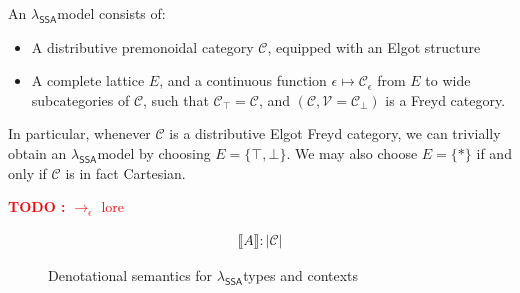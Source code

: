 \documentclass[acmsmall,screen,review]{acmart}
\newcounter{todos}
\newcommand{\TODO}[1]{{
  \stepcounter{todos}
  \begin{center}\large{\textcolor{red}{\textbf{TODO \arabic{todos}:} #1}}\end{center}
}}
\newcommand{\mc}[1]{\ensuremath{\mathcal{#1}}}
\newcommand{\ms}[1]{\ensuremath{\mathsf{#1}}}
\newcommand{\dnt}[1]{\llbracket{#1}\rrbracket}
\newcommand{\isotopessa}{\(\lambda_{\ms{SSA}}\)}
\begin{document}
An \isotopessa model consists of:
\begin{itemize}
  \item A distributive premonoidal category $\mc{C}$, equipped with an Elgot structure
  \item A complete lattice $E$, and a continuous function $\epsilon \mapsto \mc{C}_\epsilon$ from
  $E$ to wide subcategories of $\mc{C}$, such that $\mc{C}_\top = \mc{C}$, and $(\mc{C}, \mc{V} =
  \mc{C}_\bot)$ is a Freyd category.
\end{itemize}
In particular, whenever $\mc{C}$ is a distributive Elgot Freyd category, we can trivially obtain an
\isotopessa model by choosing $E = \{\top, \bot\}$. We may also choose $E = \{*\}$ if and only if
$\mc{C}$ is in fact Cartesian.

\TODO{$\to_\epsilon$ lore}

\begin{figure}[H]
  \begin{align*}
    \boxed{\dnt{A}} : |\mc{C}|
  \end{align*}
  \caption{Denotational semantics for \isotopessa types and contexts}
  \label{fig:ssa-ty-sem}
\end{figure}
\end{document}
